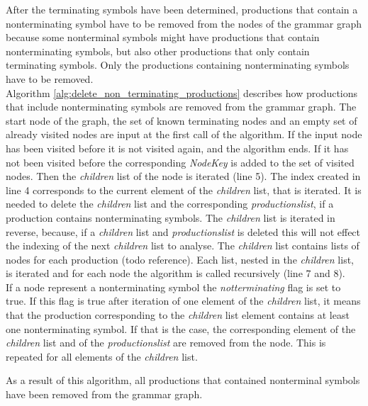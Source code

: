 After the terminating symbols have been determined, productions that contain a nonterminating symbol have to be removed from the nodes of the grammar graph because some nonterminal symbols might have productions that contain nonterminating symbols, but also other productions that only contain terminating symbols. Only the productions containing nonterminating symbols have to be removed.\\
Algorithm \ref{alg:delete_non_terminating_productions}  describes how productions that include nonterminating symbols are removed from the grammar graph.
The start node of the graph, the set of known terminating nodes and an empty set of already visited nodes are input at the first call of the algorithm.
If the input node has been visited before it is not visited again, and the algorithm ends. If it has not been visited before the corresponding \textit{Node\textunderscore Key} is added to the set of visited nodes.
Then the \textit{children} list of the node is iterated (line 5).
The index created in line 4 corresponds to the current element of the \textit{children} list, that is iterated. It is needed to delete the \textit{children} list and the corresponding \textit{productions\textunderscore list}, if a production contains nonterminating symbols. The \textit{children} list is iterated in reverse, because, if a \textit{children} list and \textit{productions\textunderscore list} is deleted this will not effect the indexing of the next \textit{children} list to analyse.
The \textit{children} list contains lists of nodes for each production (todo reference). Each list, nested in the \textit{children} list, is iterated and for each node the algorithm is called recursively (line 7 and 8).\\
If a node represent a nonterminating symbol the \textit{not\textunderscore terminating} flag is set to true.
If this flag is true after iteration of one element of the \textit{children} list, it means that the production corresponding to the \textit{children} list element contains at least one nonterminating symbol. If that is the case, the corresponding element of the \textit{children} list and of the \textit{productions\textunderscore list} are removed from the node.
This is repeated for all elements of the \textit{children} list.

As a result of this algorithm, all productions that contained nonterminal symbols have been removed from the grammar graph.


